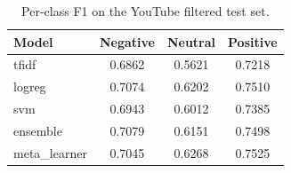 \begin{table}[htbp]
\centering
\caption{Per-class F1 on the YouTube filtered test set.}
\label{tab:youtube_filtered_per_class_f1}
\begin{tabular}{lccc}
\toprule
\textbf{Model} & \textbf{Negative} & \textbf{Neutral} & \textbf{Positive} \\
\midrule
tfidf & 0.6862 & 0.5621 & 0.7218 \\
logreg & 0.7074 & 0.6202 & 0.7510 \\
svm & 0.6943 & 0.6012 & 0.7385 \\
ensemble & 0.7079 & 0.6151 & 0.7498 \\
meta_learner & 0.7045 & 0.6268 & 0.7525 \\
\bottomrule
\end{tabular}
\end{table}
